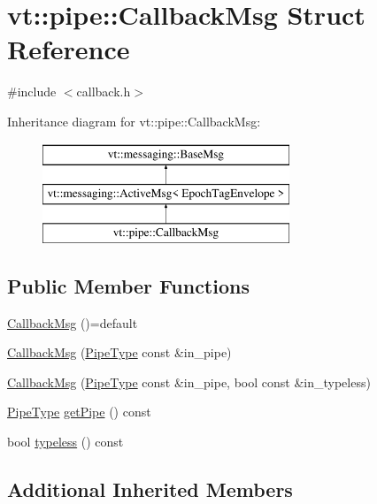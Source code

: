 \hypertarget{structvt_1_1pipe_1_1_callback_msg}{}\section{vt\+:\+:pipe\+:\+:Callback\+Msg Struct Reference}
\label{structvt_1_1pipe_1_1_callback_msg}


{\ttfamily \#include $<$callback.\+h$>$}

Inheritance diagram for vt\+:\+:pipe\+:\+:Callback\+Msg\+:\begin{figure}[H]
\begin{center}
\leavevmode
\includegraphics[height=3.000000cm]{structvt_1_1pipe_1_1_callback_msg}
\end{center}
\end{figure}
\subsection*{Public Member Functions}
\begin{DoxyCompactItemize}
\item 
\hyperlink{structvt_1_1pipe_1_1_callback_msg_a31175588e570e8c336713df369085818}{Callback\+Msg} ()=default
\item 
\hyperlink{structvt_1_1pipe_1_1_callback_msg_a7f76dcea5d02f81d3bec208875eaf711}{Callback\+Msg} (\hyperlink{namespacevt_ac9852acda74d1896f48f406cd72c7bd3}{Pipe\+Type} const \&in\+\_\+pipe)
\item 
\hyperlink{structvt_1_1pipe_1_1_callback_msg_a5d04652e2ec08b882a9f1caec0fee007}{Callback\+Msg} (\hyperlink{namespacevt_ac9852acda74d1896f48f406cd72c7bd3}{Pipe\+Type} const \&in\+\_\+pipe, bool const \&in\+\_\+typeless)
\item 
\hyperlink{namespacevt_ac9852acda74d1896f48f406cd72c7bd3}{Pipe\+Type} \hyperlink{structvt_1_1pipe_1_1_callback_msg_aeddb711b3d197e766b384692246ed4a5}{get\+Pipe} () const
\item 
bool \hyperlink{structvt_1_1pipe_1_1_callback_msg_ae7c7bf7e1998626719e0dd08ddfc8738}{typeless} () const
\end{DoxyCompactItemize}
\subsection*{Additional Inherited Members}



